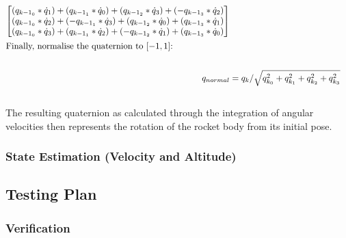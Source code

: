 {\begin{align*}
\begin{bmatrix}
            (q_{{k-1}_0} * \dot q_1) + (q_{{k-1}_1} * \dot q_0) + (q_{{k-1}_2} * \dot q_3) + (-q_{{k-1}_3} * \dot q_2)\\
            (q_{{k-1}_0} * \dot q_2) + (-q_{{k-1}_1} * \dot q_3) + (q_{{k-1}_2} * \dot q_0) + (q_{{k-1}_3} * \dot q_1)\\
            (q_{{k-1}_0} * \dot q_3) + (q_{{k-1}_1} * \dot q_2) + (-q_{{k-1}_2} * \dot q_1) + (q_{{k-1}_3} * \dot q_0)
             \end{bmatrix}\\
    \intertext{Finally, normalise the quaternion to $[-1,1]$:}\\
    q_{normal} &= q_{k} / \sqrt{q_{k_0}^2 + q_{k_1}^2 + q_{k_2}^2 + q_{k_3}^2}
\end{align*}
}\\

\noindent The resulting quaternion as calculated through the integration of angular velocities then represents the rotation of the rocket body from its initial pose.

\subsubsection{State Estimation (Velocity and Altitude)}

\subsection{Testing Plan}
\subsubsection{Verification}
\let\olditemize=\itemize \let\endolditemize=\enditemize \renewenvironment{itemize}{\olditemize \itemsep-0.5em}{\endolditemize}

